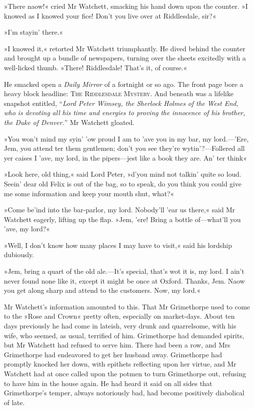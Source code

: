 »There naow!« cried Mr Watchett, smacking his hand down upon the counter. »I knowed as I knowed your fice! Don't you live over at Riddlesdale, sir?«

»I'm stayin' there.«

»I knowed it,« retorted Mr Watchett triumphantly. He dived behind the counter and brought up a bundle of newspapers, turning over the sheets excitedly with a well-licked thumb. »There! Riddlesdale! That's it, of course.«

He smacked open a \textit{Daily Mirror} of a fortnight or so ago. The front page bore a heavy block headline: \textsc{The Riddlesdale Mystery}. And beneath was a lifelike snapshot entitled, \enquote{\textit{Lord Peter Wimsey, the Sherlock Holmes of the West End, who is devoting all his time and energies to proving the innocence of his brother, the Duke of Denver.}} Mr Watchett gloated.

»You won't mind my syin' 'ow proud I am to 'ave you in my bar, my lord.---'Ere, Jem, you attend ter them gentlemen; don't you see they're wytin'?---Follered all yer caises I 'ave, my lord, in the pipers\allowbreak---\allowbreak jest like a book they are. An' ter think\longdash«

»Look here, old thing,« said Lord Peter, »d'you mind not talkin' quite so loud. Seein' dear old Felix is out of the bag, so to speak, do you think you could give me some information and keep your mouth shut, what?«

»Come be'ind into the bar-parlor, my lord. Nobody'll 'ear us there,« said Mr Watchett eagerly, lifting up the flap. »Jem, 'ere! Bring a bottle of\allowbreak---\allowbreak what'll you 'ave, my lord?«

»Well, I don't know how many places I may have to visit,« said his lordship dubiously.

»Jem, bring a quart of the old ale.---It's special, that's wot it is, my lord. I ain't never found none like it, except it might be once at Oxford. Thanks, Jem. Naow you get along sharp and attend to the customers. Now, my lord.«

Mr Watchett's information amounted to this. That Mr Grimethorpe used to come to the »Rose and Crown« pretty often, especially on market-days. About ten days previously he had come in lateish, very drunk and quarrelsome, with his wife, who seemed, as usual, terrified of him. Grimethorpe had demanded spirits, but Mr Watchett had refused to serve him. There had been a row, and Mrs Grimethorpe had endeavored to get her husband away. Grimethorpe had promptly knocked her down, with epithets reflecting upon her virtue, and Mr Watchett had at once called upon the potmen to turn Grimethorpe out, refusing to have him in the house again. He had heard it said on all sides that Grimethorpe's temper, always notoriously bad, had become positively diabolical of late.

